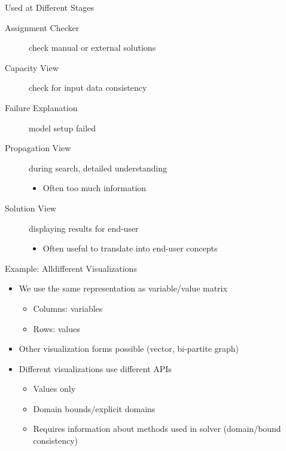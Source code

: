 \begin{frame}{Used at Different Stages}
\begin{description}
    \item[Assignment Checker] check manual or external solutions
    \item[Capacity View] check for input data consistency
    \item[Failure Explanation] model setup failed
    \item[Propagation View] during search, detailed understanding
    \begin{itemize}
        \item Often too much information
    \end{itemize}
    \item[Solution View] displaying results for end-user
    \begin{itemize}
        \item Often useful to translate into end-user concepts
    \end{itemize}
\end{description}    
\end{frame}

\begin{frame}{Example: Alldifferent Visualizations}
\begin{itemize}
    \item We use the same representation as variable/value matrix
    \begin{itemize}
        \item Columns: variables
        \item Rows: values
    \end{itemize}
    \item Other visualization forms possible (vector, bi-partite graph)
    \item Different visualizations use different APIs
    \begin{itemize}
        \item Values only
        \item Domain bounds/explicit domains
        \item Requires information about methods used in solver (domain/bound consistency)
    \end{itemize}
\end{itemize}
\end{frame}

